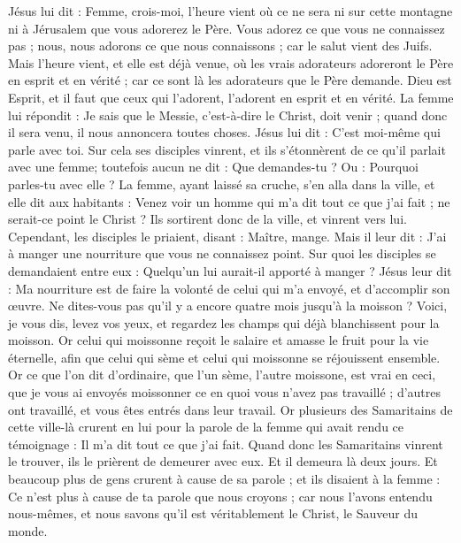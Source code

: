 \begin{multicols}{2}
Jésus lui dit : Femme, crois-moi, l'heure vient où ce ne sera ni sur cette montagne ni à Jérusalem que vous adorerez le Père.
Vous adorez ce que vous ne connaissez pas ; nous, nous adorons ce que nous connaissons ; car le salut vient des Juifs.
Mais l'heure vient, et elle est déjà venue, où les vrais adorateurs adoreront le Père en esprit et en vérité ; car ce sont là les adorateurs que le Père demande.
Dieu est Esprit, et il faut que ceux qui l'adorent, l'adorent en esprit et en vérité.
La femme lui répondit : Je sais que le Messie, c'est-à-dire le Christ, doit venir ; quand donc il sera venu, il nous annoncera toutes choses.
Jésus lui dit : C'est moi-même qui parle avec toi.
Sur cela ses disciples vinrent, et ils s'étonnèrent de ce qu'il parlait avec une femme; toutefois aucun ne dit : Que demandes-tu ? Ou : Pourquoi parles-tu avec elle ?
La femme, ayant laissé sa cruche, s'en alla dans la ville, et elle dit aux habitants :
Venez voir un homme qui m'a dit tout ce que j'ai fait ; ne serait-ce point le Christ ?
Ils sortirent donc de la ville, et vinrent vers lui.
Cependant, les disciples le priaient, disant : Maître, mange.
Mais il leur dit : J'ai à manger une nourriture que vous ne connaissez point.
Sur quoi les disciples se demandaient entre eux : Quelqu'un lui aurait-il apporté à manger ?
Jésus leur dit : Ma nourriture est de faire la volonté de celui qui m'a envoyé, et d'accomplir son œuvre.
Ne dites-vous pas qu'il y a encore quatre mois jusqu'à la moisson ? Voici, je vous dis, levez vos yeux, et regardez les champs qui déjà blanchissent pour la moisson.
Or celui qui moissonne reçoit le salaire et amasse le fruit pour la vie éternelle, afin que celui qui sème et celui qui moissonne se réjouissent ensemble.
Or ce que l'on dit d'ordinaire, que l'un sème, l'autre moissone, est vrai en ceci,
que je vous ai envoyés moissonner ce en quoi vous n'avez pas travaillé ; d'autres ont travaillé, et vous êtes entrés dans leur travail.
Or plusieurs des Samaritains de cette ville-là crurent en lui pour la parole de la femme qui avait rendu ce témoignage : Il m'a dit tout ce que j'ai fait.
Quand donc les Samaritains vinrent le trouver, ils le prièrent de demeurer avec eux. Et il demeura là deux jours.
Et beaucoup plus de gens crurent à cause de sa parole ;
et ils disaient à la femme : Ce n'est plus à cause de ta parole que nous croyons ; car nous l'avons entendu nous-mêmes, et nous savons qu'il est véritablement le Christ, le Sauveur du monde.

\end{multicols}
